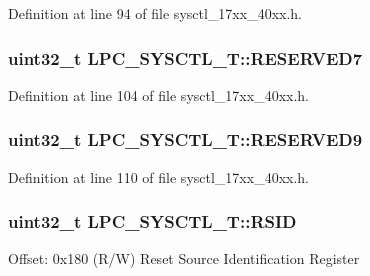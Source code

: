 Definition at line 94 of file sysctl\+\_\+17xx\+\_\+40xx.\+h.

\subsubsection[{\texorpdfstring{R\+E\+S\+E\+R\+V\+E\+D7}{RESERVED7}}]{ uint32\+\_\+t L\+P\+C\+\_\+\+S\+Y\+S\+C\+T\+L\+\_\+\+T\+::\+R\+E\+S\+E\+R\+V\+E\+D7}\hypertarget{structLPC__SYSCTL__T_a0cd1931e0f0768d7d450f68b734a7b16}{}\label{structLPC__SYSCTL__T_a0cd1931e0f0768d7d450f68b734a7b16}


Definition at line 104 of file sysctl\+\_\+17xx\+\_\+40xx.\+h.

\subsubsection[{\texorpdfstring{R\+E\+S\+E\+R\+V\+E\+D9}{RESERVED9}}]{\setlength{\rightskip}{0pt plus 5cm}uint32\+\_\+t L\+P\+C\+\_\+\+S\+Y\+S\+C\+T\+L\+\_\+\+T\+::\+R\+E\+S\+E\+R\+V\+E\+D9}\hypertarget{structLPC__SYSCTL__T_a12fa7b1279b627ede2d98fc594ef12e8}{}\label{structLPC__SYSCTL__T_a12fa7b1279b627ede2d98fc594ef12e8}


Definition at line 110 of file sysctl\+\_\+17xx\+\_\+40xx.\+h.

\subsubsection[{\texorpdfstring{R\+S\+ID}{RSID}}]{ uint32\+\_\+t L\+P\+C\+\_\+\+S\+Y\+S\+C\+T\+L\+\_\+\+T\+::\+R\+S\+ID}\hypertarget{structLPC__SYSCTL__T_a50cd4f8d03ea4b39516add82ac2dfd1a}{}\label{structLPC__SYSCTL__T_a50cd4f8d03ea4b39516add82ac2dfd1a}
Offset\+: 0x180 (R/W) Reset Source Identification Register 

